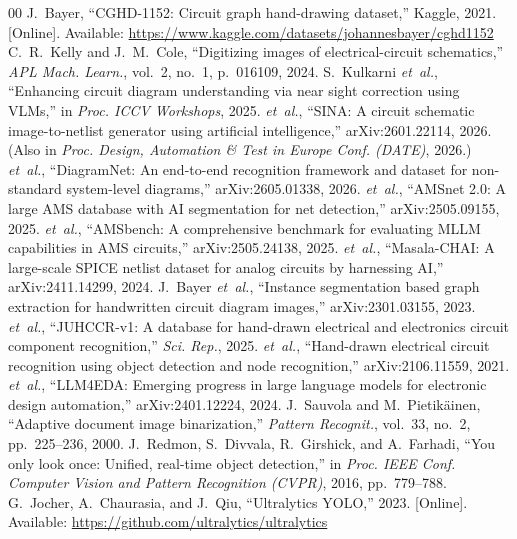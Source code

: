 \documentclass[conference]{IEEEtran}
\begin{document}
\begin{thebibliography}{00}
 J.~Bayer, ``CGHD-1152: Circuit graph hand-drawing dataset,'' Kaggle, 2021. [Online]. Available: \url{https://www.kaggle.com/datasets/johannesbayer/cghd1152}
 C.~R.~Kelly and J.~M.~Cole, ``Digitizing images of electrical-circuit schematics,'' \textit{APL Mach. Learn.}, vol.~2, no.~1, p.~016109, 2024.
 S.~Kulkarni \textit{et~al.}, ``Enhancing circuit diagram understanding via near sight correction using VLMs,'' in \textit{Proc. ICCV Workshops}, 2025.
 \textit{et~al.}, ``SINA: A circuit schematic image-to-netlist generator using artificial intelligence,'' arXiv:2601.22114, 2026. (Also in \textit{Proc. Design, Automation \& Test in Europe Conf. (DATE)}, 2026.)
 \textit{et~al.}, ``DiagramNet: An end-to-end recognition framework and dataset for non-standard system-level diagrams,'' arXiv:2605.01338, 2026.
 \textit{et~al.}, ``AMSnet 2.0: A large AMS database with AI segmentation for net detection,'' arXiv:2505.09155, 2025.
 \textit{et~al.}, ``AMSbench: A comprehensive benchmark for evaluating MLLM capabilities in AMS circuits,'' arXiv:2505.24138, 2025.
 \textit{et~al.}, ``Masala-CHAI: A large-scale SPICE netlist dataset for analog circuits by harnessing AI,'' arXiv:2411.14299, 2024.
 J.~Bayer \textit{et~al.}, ``Instance segmentation based graph extraction for handwritten circuit diagram images,'' arXiv:2301.03155, 2023.
 \textit{et~al.}, ``JUHCCR-v1: A database for hand-drawn electrical and electronics circuit component recognition,'' \textit{Sci. Rep.}, 2025.
 \textit{et~al.}, ``Hand-drawn electrical circuit recognition using object detection and node recognition,'' arXiv:2106.11559, 2021.
 \textit{et~al.}, ``LLM4EDA: Emerging progress in large language models for electronic design automation,'' arXiv:2401.12224, 2024.
 J.~Sauvola and M.~Pietik\"{a}inen, ``Adaptive document image binarization,'' \textit{Pattern Recognit.}, vol.~33, no.~2, pp.~225--236, 2000.
 J.~Redmon, S.~Divvala, R.~Girshick, and A.~Farhadi, ``You only look once: Unified, real-time object detection,'' in \textit{Proc. IEEE Conf. Computer Vision and Pattern Recognition (CVPR)}, 2016, pp.~779--788.
 G.~Jocher, A.~Chaurasia, and J.~Qiu, ``Ultralytics YOLO,'' 2023. [Online]. Available: \url{https://github.com/ultralytics/ultralytics}

\end{thebibliography}
\end{document}
